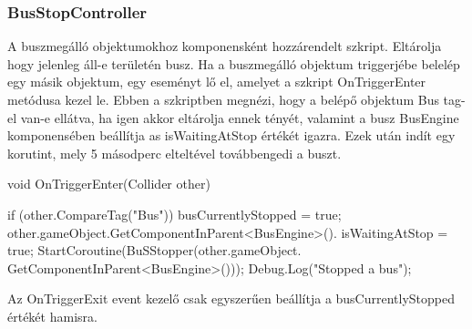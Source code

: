 \subsubsection{BusStopController}
A buszmegálló objektumokhoz komponensként hozzárendelt szkript. Eltárolja hogy jelenleg áll-e területén busz. Ha a buszmegálló objektum triggerjébe belelép egy másik objektum, egy eseményt lő el, amelyet a szkript OnTriggerEnter metódusa kezel le. Ebben a szkriptben megnézi, hogy a belépő objektum Bus tag-el van-e ellátva, ha igen akkor eltárolja ennek tényét, valamint a busz BusEngine komponensében beállítja as isWaitingAtStop értékét igazra. Ezek után indít egy korutint, mely 5 másodperc elteltével továbbengedi a buszt.
\begin{cpp}
void OnTriggerEnter(Collider other)
    {
        
        if (other.CompareTag("Bus"))
        {
            busCurrentlyStopped = true;
            other.gameObject.GetComponentInParent<BusEngine>().
            isWaitingAtStop = true;
            StartCoroutine(BuSStopper(other.gameObject.
            GetComponentInParent<BusEngine>()));
            Debug.Log("Stopped a bus");
        }
    }
\end{cpp}
Az OnTriggerExit event kezelő csak egyszerűen beállítja a busCurrentlyStopped értékét hamisra.
